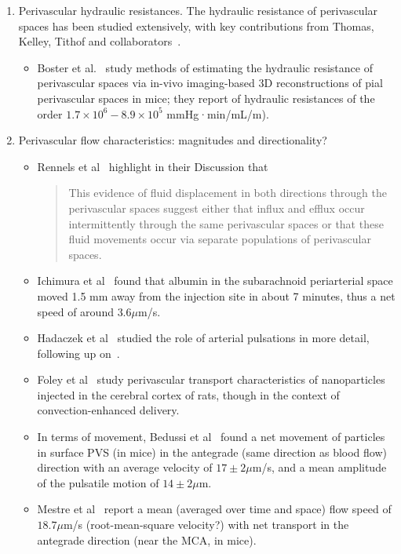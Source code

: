 \documentclass[fleqn,10pt]{wlscirep}
\begin{document}
\begin{enumerate}
\begin{itemize}
  \end{itemize}
\item
  Perivascular hydraulic resistances. The hydraulic resistance of
  perivascular spaces has been studied extensively, with key
  contributions from Thomas, Kelley, Tithof and collaborators~\cite{tithof2019hydraulic}.
  \begin{itemize}
  \item Boster et al.~\cite{boster2024hydraulic} study methods of estimating the hydraulic resistance of perivascular spaces via in-vivo imaging-based 3D reconstructions of pial perivascular spaces in mice; they report of hydraulic resistances of the order $1.7 \times 10^6 - 8.9 \times 10^5$ mmHg·min/mL/m).
  \end{itemize}
\item
  Perivascular flow characteristics: magnitudes and directionality?
  \begin{itemize}
  \item
    Rennels et al~\cite{rennels1985evidence} highlight in their
    Discussion that
    \begin{quote}
      This evidence of fluid displacement in both directions through
      the perivascular spaces suggest either that influx and efflux
      occur intermittently through the same perivascular spaces or
      that these fluid movements occur via separate populations of
      perivascular spaces.
    \end{quote}
  \item
    Ichimura et al~\cite{ichimura1991distribution} found that albumin in the subarachnoid periarterial space moved 1.5 mm away from the injection site in about 7 minutes, thus a net speed of around $3.6 \mu$m/s. 
  \item
    Hadaczek et al~\cite{hadaczek2006perivascular} studied the role of arterial pulsations in more detail, following up on~\cite{rennels1985evidence}.
  \item Foley et al~\cite{foley2012realtime} study perivascular transport characteristics of nanoparticles injected in the cerebral cortex of rats, though in the context of convection-enhanced delivery.
  \item
    In terms of movement, Bedussi et al~\cite{bedussi2018paravascular} found a net movement of particles in surface PVS (in mice) in the antegrade (same direction as blood flow) direction with an average velocity of $17 \pm 2\mu$m/s, and a mean amplitude of the pulsatile motion of $14 \pm 2 \mu$m.
\item Mestre et al~\cite{mestre2018flow} report a mean (averaged over time and space) flow speed of $18.7 \mu$m/s (root-mean-square velocity?) with net transport in the antegrade direction (near the MCA, in mice).

\end{itemize}
\end{enumerate}
\end{document}
